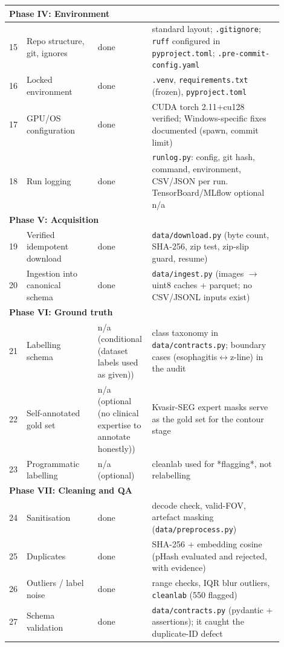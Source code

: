 \begin{longtable}{p{0.05\linewidth}p{0.25\linewidth}p{0.14\linewidth}p{0.46\linewidth}}
\midrule\multicolumn{4}{l}{\textbf{Phase IV: Environment}}\\\midrule
15 & Repo structure, git, ignores & done & standard layout; \texttt{.gitignore}; \texttt{ruff} configured in \texttt{pyproject.toml}; \texttt{.pre-commit-config.yaml} \\
16 & Locked environment & done & \texttt{.venv}, \texttt{requirements.txt} (frozen), \texttt{pyproject.toml} \\
17 & GPU/OS configuration & done & CUDA torch 2.11+cu128 verified; Windows-specific fixes documented (spawn, commit limit) \\
18 & Run logging & done & \texttt{runlog.py}: config, git hash, command, environment, CSV/JSON per run. TensorBoard/MLflow optional n/a \\
\midrule\multicolumn{4}{l}{\textbf{Phase V: Acquisition}}\\\midrule
19 & Verified idempotent download & done & \texttt{data/download.py} (byte count, SHA-256, zip test, zip-slip guard, resume) \\
20 & Ingestion into canonical schema & done & \texttt{data/ingest.py} (images \ensuremath{\rightarrow} uint8 caches + parquet; no CSV/JSONL inputs exist) \\
\midrule\multicolumn{4}{l}{\textbf{Phase VI: Ground truth}}\\\midrule
21 & Labelling schema & n/a (conditional (dataset labels used as given)) & class taxonomy in \texttt{data/contracts.py}; boundary cases (esophagitis\ensuremath{\leftrightarrow}z-line) in the audit \\
22 & Self-annotated gold set & n/a (optional (no clinical expertise to annotate honestly)) & Kvasir-SEG expert masks serve as the gold set for the contour stage \\
23 & Programmatic labelling & n/a (optional) & cleanlab used for *flagging*, not relabelling \\
\midrule\multicolumn{4}{l}{\textbf{Phase VII: Cleaning and QA}}\\\midrule
24 & Sanitisation & done & decode check, valid-FOV, artefact masking (\texttt{data/preprocess.py}) \\
25 & Duplicates & done & SHA-256 + embedding cosine (pHash evaluated and rejected, with evidence) \\
26 & Outliers / label noise & done & range checks, IQR blur outliers, \texttt{cleanlab} (550 flagged) \\
27 & Schema validation & done & \texttt{data/contracts.py} (pydantic + assertions); it caught the duplicate-ID defect \\

\end{longtable}
